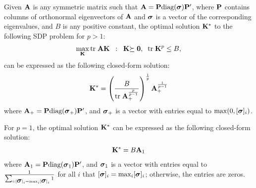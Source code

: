\begin{prop}\label{prop:sdp-eigen_decom}
Given $\A$ is any symmetric matrix such that $\A=\P\diag(\bsigma)\P'$, where $\P$
contains columns of orthonormal eigenvectors of $\A$ and $\bsigma$ is a vector of the
corresponding eigenvalues, and $B$ is any positive constant, the optimal solution
$\K^*$ to the following SDP problem for $p > 1$:
\begin{eqnarray}\label{eqn:AB-sdp}
\max_{\K}\tr \A\K\;\;:\;\;\K\psd,\;\;\tr\K^p \leq B,
\end{eqnarray}
can be expressed as the following closed-form solution:
\begin{equation}
\K^*=\left(\frac{B}{\tr\A_+^{\frac{p}{p-1}}}\right)^{\frac{1}{p}}\A_+^{\frac{1}{p-1}}\label{eqn:optimal_K}
\end{equation}
where  $\A_+=\P\diag(\bsigma_+)\P'$,  and $\bsigma_+$ is a vector with entries equal to $\max(0,[\bsigma]_i)$.

For $p=1$,  the optimal solution $\K^*$ can be expressed as the following
closed-form solution:
\begin{equation}
\K^*=B\A_1\nonumber%
\end{equation}
where  $\A_1=\P\diag(\bsigma_1)\P'$,  and $\bsigma_1$ is a vector with entries equal
to $\frac{1}{\sum_{i:[\bsigma]_i=\max_i[\bsigma]_i}1}$ for all $i$ that
$[\bsigma]_i=\max_i[\bsigma]_i$; otherwise, the entries are zeros.
\end{prop}

